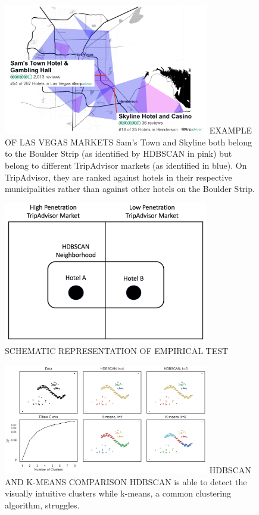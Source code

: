 \begin{figure}[htp]
\FIGURE
{\includegraphics[width=0.8\textwidth,height=\textheight,keepaspectratio]{./Figures/LasVegasMarkets.png}}
{EXAMPLE OF LAS VEGAS MARKETS\label{fig:vegas}}
{Sam's Town and Skyline both belong to the Boulder Strip (as identified by HDBSCAN in pink) but belong to different TripAdvisor markets (as identified in blue). On TripAdvisor, they are ranked against hotels in their respective municipalities rather than against other hotels on the Boulder Strip.}
\end{figure}
\clearpage

\begin{figure}[htp]
\FIGURE
{\includegraphics[width=0.8\textwidth,height=\textheight,keepaspectratio]{./Figures/Schematic.png}}
{SCHEMATIC REPRESENTATION OF EMPIRICAL TEST\label{fig:abmarkets}}
{}
\end{figure}
\clearpage

\begin{figure}[htp]
\FIGURE
{\includegraphics[width=0.8\textwidth,height=\textheight,keepaspectratio]{./Figures/clusters.png}}
{HDBSCAN AND K-MEANS COMPARISON\label{fig:cluster}}
{HDBSCAN is able to detect the visually intuitive clusters while k-means, a common clustering algorithm, struggles.}
\end{figure}
\clearpage

